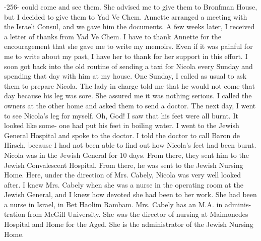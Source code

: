 ﻿-256- 
could come and see them. She advised me to give them to Bronfman House, but I decided to give them to Yad Ve Chem. Annette 
arranged a meeting with the Israeli Consul, and we gave him the documents. A few weeks later, I received a letter of thanks from Yad 
Ve Chem. 
I have to thank Annette for the encouragement that she gave me 
to write my memoirs. Even if it was painful for me to write about 
my past, I have her to thank for her support in this effort. 
I soon got back into the old routine of sending a taxi for Nicola every Sunday and spending that day with him at my house. One 
Sunday, I called as usual to ask them to prepare Nicola. The lady 
in charge told me that he would not come that day because his leg 
was sore. She assured me it was nothing serious. I called the owners 
at the other home and asked them to send a doctor. 
The next day, I went to see Nicola's leg for myself. 
Oh, God! I saw that his feet were all burnt. It looked like some-
one had put his feet in boiling water. I went to the Jewish General 
Hospital and spoke to the doctor. I told the doctor to call Baron 
de Hirsch, because I had not been able to find out how Nicola's 
feet had been burnt. 
Nicola was in the Jewish General for 10 days. From there, they 
sent him to the Jewish Convalescent Hospital. From there, he was 
sent to the Jewish Nursing Home. Here, under the direction of Mrs. 
Cabely, Nicola was very well looked after. I knew Mrs. Cabely when 
she was a nurse in the operating room at the Jewish General, and I 
knew how devoted she had been to her work. She had been a nurse in 
Israel, in Bet Haolim Rambam. Mrs. Cabely has an M.A. in adminis-
tration from McGill University. She was the director of nursing at 
Maimonedes Hospital and Home for the Aged. She is the administrator of the Jewish Nursing Home.

